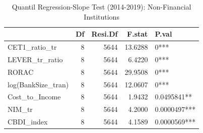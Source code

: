 \begin{table}[ht]
\centering
\caption{Quantil Regression-Slope Test (2014-2019): Non-Financial Institutions} 
\begingroup\small
\begin{tabular}{lrrrl}
  \toprule
 & Df & Resi.Df & F.stat & P.val \\ 
  \midrule
CET1\_ratio\_tr & 8 & 5644 & 13.6288 & 0*** \\ 
  LEVER\_tr\_ratio & 8 & 5644 & 6.4220 & 0*** \\ 
  RORAC & 8 & 5644 & 29.9508 & 0*** \\ 
  log(BankSize\_tran) & 8 & 5644 & 12.0607 & 0*** \\ 
  Cost\_to\_Income & 8 & 5644 & 1.9432 & 0.0495841** \\ 
  NIM\_tr & 8 & 5644 & 4.2000 & 0.0000497*** \\ 
  CBDI\_index & 8 & 5644 & 4.1589 & 0.0000569*** \\ 
   \bottomrule
\end{tabular}
\endgroup
\end{table}

